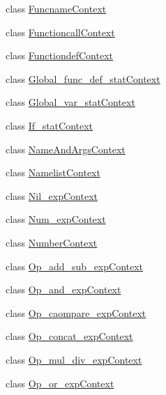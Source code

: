 \begin{DoxyCompactItemize}
\item 
class \mbox{\hyperlink{classzlua_1_1_lua_parser_1_1_funcname_context}{Funcname\+Context}}
\item 
class \mbox{\hyperlink{classzlua_1_1_lua_parser_1_1_functioncall_context}{Functioncall\+Context}}
\item 
class \mbox{\hyperlink{classzlua_1_1_lua_parser_1_1_functiondef_context}{Functiondef\+Context}}
\item 
class \mbox{\hyperlink{classzlua_1_1_lua_parser_1_1_global__func__def__stat_context}{Global\+\_\+func\+\_\+def\+\_\+stat\+Context}}
\item 
class \mbox{\hyperlink{classzlua_1_1_lua_parser_1_1_global__var__stat_context}{Global\+\_\+var\+\_\+stat\+Context}}
\item 
class \mbox{\hyperlink{classzlua_1_1_lua_parser_1_1_if__stat_context}{If\+\_\+stat\+Context}}
\item 
class \mbox{\hyperlink{classzlua_1_1_lua_parser_1_1_name_and_args_context}{Name\+And\+Args\+Context}}
\item 
class \mbox{\hyperlink{classzlua_1_1_lua_parser_1_1_namelist_context}{Namelist\+Context}}
\item 
class \mbox{\hyperlink{classzlua_1_1_lua_parser_1_1_nil__exp_context}{Nil\+\_\+exp\+Context}}
\item 
class \mbox{\hyperlink{classzlua_1_1_lua_parser_1_1_num__exp_context}{Num\+\_\+exp\+Context}}
\item 
class \mbox{\hyperlink{classzlua_1_1_lua_parser_1_1_number_context}{Number\+Context}}
\item 
class \mbox{\hyperlink{classzlua_1_1_lua_parser_1_1_op__add__sub__exp_context}{Op\+\_\+add\+\_\+sub\+\_\+exp\+Context}}
\item 
class \mbox{\hyperlink{classzlua_1_1_lua_parser_1_1_op__and__exp_context}{Op\+\_\+and\+\_\+exp\+Context}}
\item 
class \mbox{\hyperlink{classzlua_1_1_lua_parser_1_1_op__caompare__exp_context}{Op\+\_\+caompare\+\_\+exp\+Context}}
\item 
class \mbox{\hyperlink{classzlua_1_1_lua_parser_1_1_op__concat__exp_context}{Op\+\_\+concat\+\_\+exp\+Context}}
\item 
class \mbox{\hyperlink{classzlua_1_1_lua_parser_1_1_op__mul__div__exp_context}{Op\+\_\+mul\+\_\+div\+\_\+exp\+Context}}
\item 
class \mbox{\hyperlink{classzlua_1_1_lua_parser_1_1_op__or__exp_context}{Op\+\_\+or\+\_\+exp\+Context}}
\item 

\end{DoxyCompactItemize}
